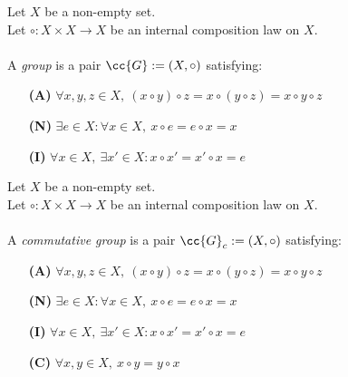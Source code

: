 \begin{definition-pre}[Group]
    \label{def:group}
    Let \(X\) be a non-empty set.\\
    Let \(\circ: X\times X \to X\) be an internal composition law on \(X\). \\\\
    A \textit{group} is a pair \(\cc{G}:= (X, \circ)\) satisfying:
    \begin{enumerate}
        \item [\textbf{(A)}] \(\forall x,y,z\in X,\ (x\circ y)\circ z= x\circ (y\circ z) = x\circ y \circ z\)
        \item [\textbf{(N)}] \(\exists e \in X : \forall x \in X,\ x\circ e = e \circ x = x\)
        \item [\textbf{(I)}] \(\forall x \in X,\ \exists x'\in X: x\circ x' = x'\circ x = e\)
    \end{enumerate}
\end{definition-pre}

\begin{definition-pre}
    \label{def:commutative_group}
    Let \(X\) be a non-empty set.\\
    Let \(\circ: X\times X \to X\) be an internal composition law on \(X\). \\\\
    A \textit{commutative group} is a pair \(\cc{G}_c:= (X, \circ)\) satisfying:
    \begin{enumerate}
        \item [\textbf{(A)}] \(\forall x,y,z\in X,\ (x\circ y)\circ z= x\circ (y\circ z) = x\circ y \circ z\)
        \item [\textbf{(N)}] \(\exists e \in X : \forall x \in X,\ x\circ e = e \circ x = x\)
        \item [\textbf{(I)}] \(\forall x \in X,\ \exists x'\in X: x\circ x' = x'\circ x = e\)
        \item [\textbf{(C)}] \(\forall x,y\in X,\ x\circ y = y\circ x\)
    \end{enumerate}
\end{definition-pre}

